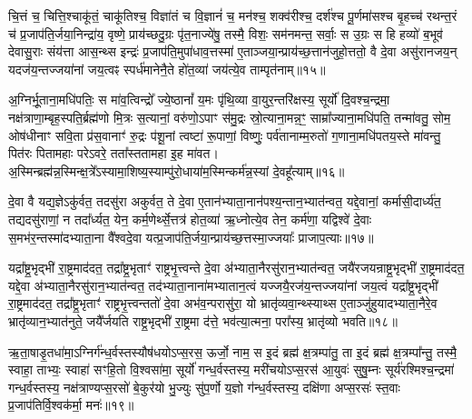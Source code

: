 चि॒त्तं च॒ चित्ति॒श्चाकू॑तं॒ चाकू॑तिश्च॒ विज्ञा॑तं च वि॒ज्ञानं॑ च॒ मन॑श्च॒ शक्व॑रीश्च॒ दर्\mbox{}श॑श्च पू॒र्णमा॑सश्च बृ॒हच्च॑ रथन्त॒रं च॑ प्र॒जाप॑ति॒र्जया॒निन्द्रा॑य॒ वृष्णे॒ प्राय॑च्छदु॒ग्रः पृ॑त॒नाज्ये॑षु॒ तस्मै॒ विशः॒ सम॑नमन्त॒ सर्वाः॒ स उ॒ग्रः स हि हव्यो॑ ब॒भूव॑ देवासु॒राः संय॑त्ता आस॒न्थ्स इन्द्रः॑ प्र॒जाप॑ति॒मुपा॑धाव॒त्तस्मा॑ ए॒ताञ्जया॒न्प्राय॑च्छ॒त्तान॑जुहो॒त्ततो॒ वै दे॒वा असु॑रानजय॒न् य\-दज॑य॒न्तज्जया॑नां जय॒त्वꣴ स्पर्ध॑मानेनै॒ते हो॑त॒व्या॑ जय॑त्ये॒व ताम्पृत॑नाम्॥१५॥

{\anuvakamend[{उप॒ पञ्च॑विꣳशतिश्च॥४॥}]}

अ॒ग्निर्भू॒ताना॒मधि॑पतिः॒ स मा॑व॒त्विन्द्रो᳚ ज्ये॒ष्ठानां᳚ य॒मः पृ॑थि॒व्या वा॒युर॒न्तरि॑क्षस्य॒ सूर्यो॑ दि॒वश्च॒न्द्रमा॒ नक्ष॑त्राणा॒म्बृह॒स्पति॒र्ब्रह्म॑णो मि॒त्रः स॒त्यानां॒ वरु॑णो॒\-ऽपाꣳ स॑मु॒द्रः स्रो॒त्याना॒मन्न॒ꣳ॒ साम्रा᳚ज्याना॒मधि॑पति॒ तन्मा॑वतु॒ सोम॒ ओष॑धीनाꣳ सवि॒ता प्र॑स॒वानाꣳ॑ रु॒द्रः प॑शू॒नां त्वष्टा॑ रू॒पाणां॒ विष्णुः॒ पर्व॑तानाम्म॒रुतो॑ ग॒णाना॒मधि॑पतय॒स्ते मा॑वन्तु॒ पित॑रः पितामहाः परे\-ऽवरे॒ तता᳚स्ततामहा इ॒ह मा॑वत। अ॒स्मिन्ब्रह्म॑न्न॒स्मिन्क्ष॒त्रे᳚\-ऽस्यामा॒शिष्य॒स्याम्पु॑रो॒धाया॑\-म॒स्मिन्कर्म॑न्न॒स्यां दे॒वहू᳚त्याम्॥१६॥

{\anuvakamend[{अ॒व॒रे॒ स॒प्तद॑श च॥५॥}]}

दे॒वा वै यद्य॒ज्ञे\-ऽकु॑र्वत॒ तदसु॑रा अकुर्वत॒ ते दे॒वा ए॒तान॑भ्याता॒नान॑पश्य॒न्तान॒भ्यात॑न्वत॒ यद्दे॒वानां॒ कर्मासी॒दार्ध्य॑त॒ तद्यदसु॑राणां॒ न तदा᳚र्ध्यत॒ येन॒ कर्म॒णेर्थ्से॒त्तत्र॑ होत॒व्या॑ ऋ॒ध्नोत्ये॒व तेन॒ कर्म॑णा॒ यद्विश्वे॑ दे॒वाः स॒मभ॑र॒न्तस्मा॑दभ्याता॒ना वै᳚श्वदे॒वा यत्प्र॒जाप॑ति॒र्जया॒न्प्राय॑च्छ॒त्तस्मा॒ज्जयाः᳚ प्राजाप॒त्याः॥१७॥

यद्रा᳚ष्ट्र॒भृद्भी॑ रा॒ष्ट्रमाद॑दत॒ तद्रा᳚ष्ट्र॒भृताꣳ॑ राष्ट्रभृ॒त्त्वन्ते दे॒वा अ॑भ्याता॒नैरसु॑रान॒भ्यात॑न्वत॒ जयै॑रजयन्राष्ट्र॒भृद्भी॑ रा॒ष्ट्रमाद॑दत॒ यद्दे॒वा अ॑भ्याता॒नैरसु॑रान॒भ्यात॑न्वत॒ तद॑भ्याता॒नाना॑मभ्यातान॒त्वं यज्जयै॒रज॑य॒न्तज्जया॑नां जय॒त्वं यद्रा᳚ष्ट्र॒भृद्भी॑ रा॒ष्ट्रमाद॑दत॒ तद्रा᳚ष्ट्र॒भृताꣳ॑ राष्ट्रभृ॒त्त्वन्ततो॑ दे॒वा अभ॑व॒न्परासु॑रा॒ यो भ्रातृ॑व्यवा॒न्थ्स्याथ्स ए॒ताञ्जु॑हुयादभ्याता॒नैरे॒व भ्रातृ॑व्यान॒भ्यात॑नुते॒ जयै᳚र्जयति राष्ट्र॒भृद्भी॑ रा॒ष्ट्रमा द॑त्ते॒ भव॑त्या॒त्मना॒ परा᳚स्य॒ भ्रातृ॑व्यो भवति॥१८॥

{\anuvakamend[{प्रा॒जा॒प॒त्याः सो᳚\-ऽष्टाद॑श च॥६॥}]}

ऋ॒ता॒षाडृ॒तधा॑मा॒\-ऽग्निर्ग॑न्ध॒र्वस्तस्यौष॑धयो\-ऽप्स॒रस॒ ऊर्जो॒ नाम॒ स इ॒दं ब्रह्म॑ क्ष॒त्रम्पा॑तु॒ ता इ॒दं ब्रह्म॑ क्ष॒त्रम्पा᳚न्तु॒ तस्मै॒ स्वाहा॒ ताभ्यः॒ स्वाहा॑ सꣳहि॒तो वि॒श्वसा॑मा॒ सूर्यो॑ गन्ध॒र्वस्तस्य॒ मरी॑चयो\-ऽप्स॒रस॑ आ॒युवः॑ सुषु॒म्नः सूर्य॑रश्मिश्च॒न्द्रमा॑ गन्ध॒र्वस्तस्य॒ नक्ष॑त्राण्यप्स॒रसो॑ बे॒कुर॑यो भु॒ज्युः सु॑प॒र्णो य॒ज्ञो ग॑न्ध॒र्वस्तस्य॒ दक्षि॑णा अप्स॒रसः॑ स्त॒वाः प्र॒जाप॑तिर्वि॒श्वक॑र्मा॒ मनः॑॥१९॥

